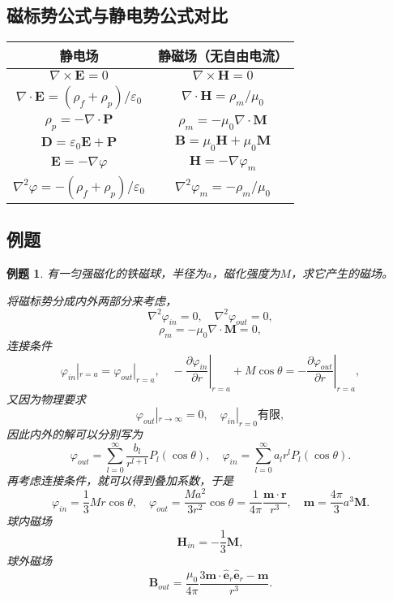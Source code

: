 \documentclass[UTF8]{ctexbook}
\renewcommand{\b}{\boldsymbol}
\newtheorem{eg}{例题}
\numberwithin{equation}{chapter}
\begin{document}
	\subsection{磁标势公式与静电势公式对比}
	\begin{table}[H]
		\centering
		\begin{tabular}{c|c}
			\hline
			静电场 & 静磁场（无自由电流） \\ \hline
			$\nabla \times \b{E}=0$ & $\nabla\times\b{H}=0$ \\ \hline
			$\nabla\cdot\b{E}=(\rho_f+\rho_p)/\varepsilon_0
			$ & $\nabla\cdot\b{H}=\rho_m/\mu_0$ \\ \hline
			$\rho_p=-\nabla\cdot\b{P}$ & $ \rho_m=-\mu_0\nabla\cdot\b{M}$ \\ \hline
			$ \b{D}=\varepsilon_0\b{E}+\b{P}$ & $\b{B}=\mu_0\b{H}+\mu_0\b{M}$\\ \hline 
			$ \b{E}=-\nabla\varphi$ & $\b{H}=-\nabla\varphi_m$ \\ \hline
			$ \nabla^2\varphi=-(\rho_f+\rho_p)/\varepsilon_0$ & $\nabla^2\varphi_m=-\rho_m/\mu_0$ \\ \hline 
		\end{tabular}
	\end{table}
	
	\subsection{例题}
	\begin{eg}
		有一匀强磁化的铁磁球，半径为$a$，磁化强度为$M$，求它产生的磁场。
		
		\begin{figure}[H]
			\centering
		\end{figure}
		将磁标势分成内外两部分来考虑，
		\[\nabla^2\varphi_{in}=0,\quad \nabla^2\varphi_{out}=0,\]
		\[\rho_m=-\mu_0\nabla\cdot\b{M}=0,\]
		连接条件
		\[\varphi_{in}|_{r=a}=\varphi_{out}|_{r=a},\quad -\left.\frac{\partial \varphi_{in}}{\partial r}\right|_{r=a}+M\cos\theta=-\left.\frac{\partial \varphi_{out}}{\partial r}\right|_{r=a},\]
		又因为物理要求
		\[\varphi_{out}|_{r\rightarrow \infty}=0,\quad \varphi_{in}|_{r=0}\text{有限},\]
		因此内外的解可以分别写为
		\[\varphi_{out}=\sum_{l=0}^\infty \frac{b_l}{r^{l+1}}P_l(\cos\theta),\quad \varphi_{in}=\sum_{l=0}^\infty a_lr^lP_l(\cos\theta).\]
		再考虑连接条件，就可以得到叠加系数，于是
		\[\varphi_{in}=\frac{1}{3}Mr\cos\theta,\quad \varphi_{out}=\frac{Ma^2}{3r^2}\cos\theta=\frac{1}{4\pi}\frac{\b{m}\cdot\b{r}}{r^3},\quad \b{m}=\frac{4\pi}{3}a^3\b{M}.\]
		球内磁场
		\[\b{H}_{in}=-\frac{1}{3}\b{M},\]
		球外磁场
		\[\b{B}_{out}=\frac{\mu_0}{4\pi}\frac{3\b{m}\cdot\hat{\b{e}}_r\hat{\b{e}}_r-\b{m}}{r^3}.\]
		
	\end{eg}
	
\end{document}
